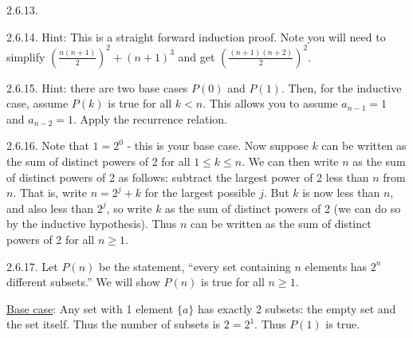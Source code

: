\begin {itemize}
\begin{ans}{2.6.13.}
	
\end{ans}
\begin{ans}{2.6.14.}
		Hint: This is a straight forward induction proof.  Note you will need to simplify $\left(\frac{n(n+1)}{2}\right)^2 + (n+1)^3$ and get $\left(\frac{(n+1)(n+2)}{2}\right)^2$.
	
\end{ans}
\begin{ans}{2.6.15.}
		Hint: there are two base cases $P(0)$ and $P(1)$.  Then, for the inductive case, assume $P(k)$ is true for all $k < n$.  This allows you to assume $a_{n-1} = 1$ and $a_{n-2} = 1$.  Apply the recurrence relation.
	
\end{ans}
\begin{ans}{2.6.16.}
		Note that $1 = 2^0$ - this is your base case.  Now suppose $k$ can be written as the sum of distinct powers of 2 for all $1\le k \le n$.  We can then write $n$ as the sum of distinct powers of 2 as follows: subtract the largest power of 2 less than $n$ from $n$.  That is, write $n = 2^j + k$ for the largest possible $j$.  But $k$ is now less than $n$, and also less than $2^j$, so write $k$ as the sum of distinct powers of 2 (we can do so by the inductive hypothesis).  Thus $n$ can be written as the sum of distinct powers of 2 for all $n \ge 1$.
	
\end{ans}
\begin{ans}{2.6.17.}
		Let $P(n)$ be the statement, ``every set containing $n$ elements has $2^n$ different subsets.''  We will show $P(n)$ is true for all $n \ge 1$.

		\underline{Base case}: Any set with 1 element $\{a\}$ has exactly 2 subsets: the empty set and the set itself.  Thus the number of subsets is $2= 2^1$.  Thus $P(1)$ is true.


\end{ans}
\end{itemize}
